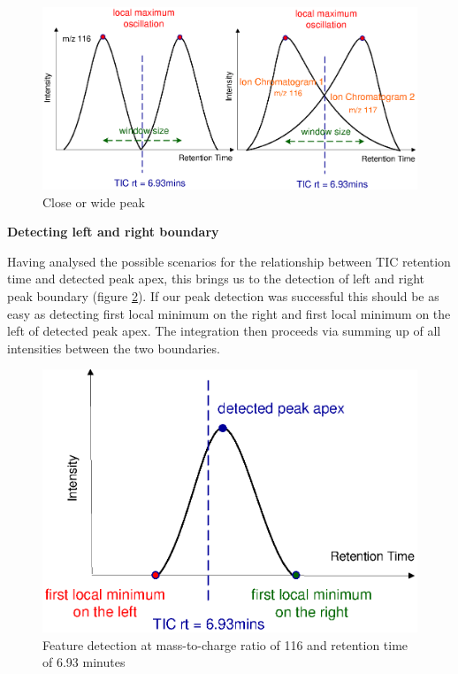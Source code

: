 \begin{figure}
  \begin{center}
    \includegraphics[scale=0.7]{graphics/chapter08/86.eps}
  \end{center}
  \caption{Close or wide peak}
  \label{fig:86}
\end{figure}

{\bf Detecting left and right boundary}

Having analysed the possible scenarios for the relationship between
TIC retention time and detected peak apex, this brings us to the detection
of left and right peak boundary (figure \ref{fig:87}). If our peak detection
was successful this should be as easy as detecting first local minimum on
the right and first local minimum on the left of detected peak apex. The
integration then proceeds via summing up of all intensities between the two
boundaries.

\begin{figure}
  \begin{center}
    \includegraphics[scale=0.7]{graphics/chapter08/87.eps}
  \end{center}
  \caption{Feature detection at mass-to-charge ratio of 116 and retention time
  of 6.93 minutes}
  \label{fig:87}
\end{figure}

